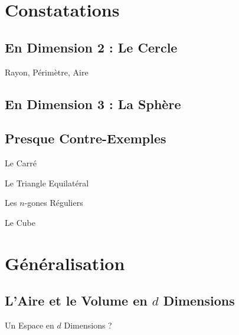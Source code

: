 \documentclass{beamercours}
\begin{document}
    \section{Constatations}
        \subsection{En Dimension 2 : Le Cercle}
            \begin{frame}{Rayon, Périmètre, Aire}

            \end{frame}

        \subsection{En Dimension 3 : La Sphère}

        \subsection{Presque Contre-Exemples}
            \begin{frame}{Le Carré}
                
            \end{frame}

            \begin{frame}{Le Triangle Equilatéral}
                
            \end{frame}

            \begin{frame}{Les $n$-gones Réguliers}
                
            \end{frame}

            \begin{frame}{Le Cube}
                
            \end{frame}

    \section{Généralisation}
        \subsection{L'Aire et le Volume en $d$ Dimensions}
            \begin{frame}{Un Espace en $d$ Dimensions ?}
            
            \end{frame}
\end{document}
